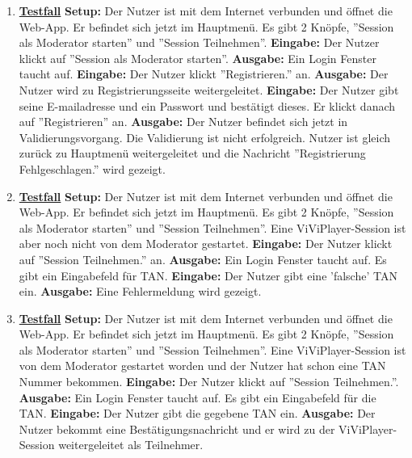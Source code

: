 \begin{enumerate}
	\item \underline{\textbf{Testfall}} \linebreak
	\textbf{Setup:} Der Nutzer ist mit dem Internet verbunden und öffnet die Web-App. Er befindet sich jetzt im Hauptmenü. Es gibt 2 Knöpfe, ''Session als Moderator starten'' und ''Session Teilnehmen''. \linebreak
	\textbf{Eingabe:} Der Nutzer klickt auf ''Session als Moderator starten''. \linebreak
	\textbf{Ausgabe:} Ein Login Fenster taucht auf.\linebreak
	\textbf{Eingabe:} Der Nutzer klickt ''Registrieren.'' an.\linebreak
	\textbf{Ausgabe:} Der Nutzer wird zu Registrierungsseite weitergeleitet.\linebreak
	\textbf{Eingabe:} Der Nutzer gibt seine E-mailadresse und ein Passwort und bestätigt dieses. Er klickt danach auf ''Registrieren'' an. \linebreak
	\textbf{Ausgabe:} Der Nutzer befindet sich jetzt in Validierungsvorgang. Die Validierung ist nicht erfolgreich. Nutzer ist gleich zurück zu Hauptmenü weitergeleitet und die Nachricht ''Registrierung Fehlgeschlagen.'' wird gezeigt.\linebreak
	
	\item \underline{\textbf{Testfall}} \linebreak
	\textbf{Setup:} Der Nutzer ist mit dem Internet verbunden und öffnet die Web-App. Er befindet sich jetzt im Hauptmenü. Es gibt 2 Knöpfe, ''Session als Moderator starten'' und ''Session Teilnehmen''.
	Eine ViViPlayer-Session ist aber noch nicht von dem Moderator gestartet. \linebreak
	\textbf{Eingabe:} Der Nutzer klickt auf ''Session Teilnehmen.'' an. \linebreak
	\textbf{Ausgabe:} Ein Login Fenster taucht auf. Es gibt ein Eingabefeld für TAN.\linebreak
	\textbf{Eingabe:} Der Nutzer gibt eine 'falsche' TAN ein. \linebreak
	\textbf{Ausgabe:} Eine Fehlermeldung wird gezeigt.
	
	\item \underline{\textbf{Testfall}} \linebreak
	\textbf{Setup:} Der Nutzer ist mit dem Internet verbunden und öffnet die Web-App. Er befindet sich jetzt im Hauptmenü. Es gibt 2 Knöpfe, ''Session als Moderator starten'' und ''Session Teilnehmen''. Eine ViViPlayer-Session ist von dem Moderator gestartet worden und der Nutzer hat schon eine TAN Nummer bekommen. \linebreak
	\textbf{Eingabe:} Der Nutzer klickt auf ''Session Teilnehmen.''. \linebreak
	\textbf{Ausgabe:} Ein Login Fenster taucht auf. Es gibt ein Eingabefeld für die TAN.\linebreak
	\textbf{Eingabe:} Der Nutzer gibt die gegebene TAN ein. \linebreak
	\textbf{Ausgabe:} Der Nutzer bekommt eine Bestätigungsnachricht und er wird zu der ViViPlayer-Session weitergeleitet als Teilnehmer.
	

\end{enumerate}

